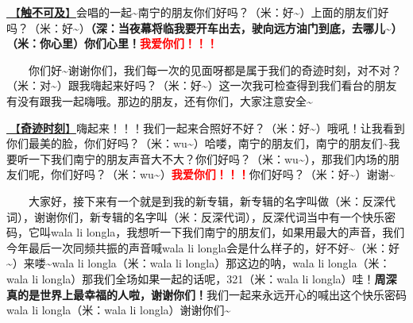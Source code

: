 \documentclass[]{ctexbook}
\begin{document}
\hyperref[untouchable]{🎵【\textbf{触不可及}】}会唱的一起\textasciitilde 南宁的朋友你们好吗？（米：好\textasciitilde）上面的朋友们好吗？（米：好\textasciitilde）\textbf{（深：当夜幕将临我要开车出去，驶向远方油门到底，去哪儿\textasciitilde）（米：你心里）你们心里！\textcolor{red}{我爱你们！！！}}

  你们好\textasciitilde 谢谢你们，我们每一次的见面呀都是属于我们的奇迹时刻，对不对？（米：对\textasciitilde）跟我嗨起来好吗？（米：好\textasciitilde）这一次我可检查得到我们看台的朋友有没有跟我一起嗨哦。那边的朋友，还有你们，大家注意安全\textasciitilde{}

\hyperref[magic-moment]{🎵【\textbf{奇迹时刻}】}嗨起来！！！我们一起来合照好不好？（米：好\textasciitilde）哦吼！让我看到你们最美的脸，你们好吗？（米：wu\textasciitilde）哈喽，南宁的朋友们，南宁的朋友们\textasciitilde 我要听一下我们南宁的朋友声音大不大？你们好吗？（米：wu\textasciitilde），那我们内场的朋友们呢，你们好吗？（米：wu\textasciitilde）\textbf{\textcolor{red}{我爱你们！！！}}你们好吗？（米：好\textasciitilde）谢谢\textasciitilde{}

  大家好，接下来有一个就是到我的新专辑，新专辑的名字叫做（米：反深代词），谢谢你们，新专辑的名字叫（米：反深代词），反深代词当中有一个快乐密码，它叫wala li longla，我想听一下我们南宁的朋友们，如果用最大的声音，我们今年最后一次同频共振的声音喊wala li longla会是什么样子的，好不好\textasciitilde（米：好\textasciitilde）来喽\textasciitilde wala li longla（米：wala li longla）那这边的呐，wala li longla（米：wala li longla）那我们全场如果一起的话呢，321（米：wala li longla）哇！\textbf{周深真的是世界上最幸福的人啦，谢谢你们！}我们一起来永远开心的喊出这个快乐密码wala li longla（米：wala li longla）谢谢你们\textasciitilde{}
\end{document}
